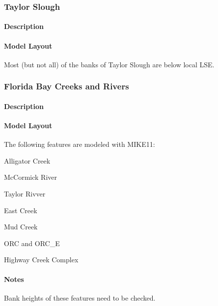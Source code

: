 \clearpage
\subsubsection{Taylor Slough}
\paragraph{Description}

\paragraph{Model Layout}
Most (but not all) of the banks of Taylor Slough are below local LSE.


\clearpage

\subsubsection{Florida Bay Creeks and Rivers}
\paragraph{Description}

\paragraph{Model Layout}

The following features are modeled with MIKE11:
\begin{packed_items}
  \item Alligator Creek
  \item McCormick River
  \item Taylor Rivver
  \item East Creek
  \item Mud Creek
  \item ORC and ORC\_E
  \item Highway Creek Complex
\end{packed_items}

\begin{notes}
\paragraph{Notes}
Bank heights of these features need to be checked.
\end{notes}

